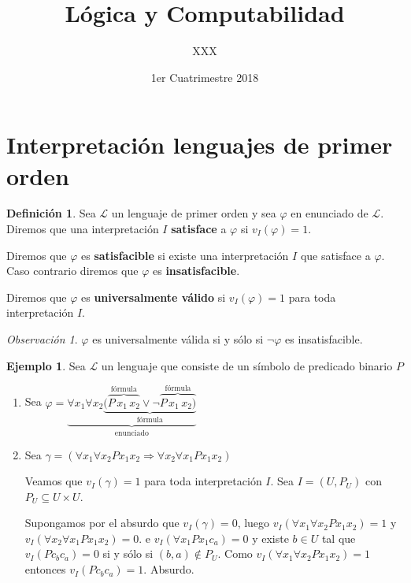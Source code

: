 \documentclass[a4paper,11pt]{article}
\title{Lógica y Computabilidad}
\author{XXX}
\date{1er Cuatrimestre 2018}
\theoremstyle{definition}
\newtheorem{defn}{Definición}[section]
\newtheorem{exap}{Ejemplo}[section]
\theoremstyle{remark}
\newtheorem*{remk}{Observación}
\def\LL{\ensuremath{\mathcal{L}}}
\begin{document}
\maketitle

\section{Interpretación lenguajes de primer orden}

\begin{defn}
    Sea $\LL$ un lenguaje de primer orden y sea $\varphi$ en enunciado de $\LL$. 
    Diremos que una interpretación $I$ \textbf{satisface} a $\varphi$
    si $v_I(\varphi) = 1$.

    Diremos que $\varphi$ es \textbf{satisfacible} si existe una
    interpretación $I$ que satisface a $\varphi$. Caso contrario diremos
    que $\varphi$ es \textbf{insatisfacible}.

    Diremos que $\varphi$ es \textbf{universalmente válido} si
    $v_I(\varphi) = 1$ para toda interpretación $I$.
\end{defn}

\begin{remk}
    $\varphi$ es universalmente válida si y sólo si $\lnot \varphi$
    es insatisfacible.
\end{remk}

\begin{exap}
    Sea $\LL$ un lenguaje que consiste de un símbolo de predicado
    binario $P$

    \begin{enumerate}
        \item Sea $\varphi = \underbrace{\forall x_1 \forall x_2 
        \underbrace{(\overbrace{P\,x_1\,x_2}^{\text{fórmula}} \lor 
        \lnot \overbrace{P\, x_1\,x_2)}^{\text{fórmula}}}_{\text{fórmula}}}_{\text{enunciado}}$

        \item Sea $\gamma = (\forall x_1 \forall x_2 P x_1 x_2
        \Rightarrow \forall x_2 \forall x_1 P x_1 x_2)$

        Veamos que $v_I(\gamma) = 1$ para toda interpretación $I$. 
        Sea $I = (U, P_U)$ con $P_U \subseteq U\times U$.

        Supongamos por el absurdo que $v_I(\gamma) = 0$, luego
        $v_I(\forall x_1 \forall x_2 P x_1 x_2) = 1$ y 
        $v_I(\forall x_2 \forall x_1 P x_1 x_2) = 0$.
        e $v_I(\forall x_1 P x_1 c_a) = 0$
        y existe $b \in U$ tal que $v_I(P c_b c_a) = 0$ si y sólo si
        $(b, a) \not\in P_U$. Como $v_I(\forall x_1 \forall x_2 P x_1 x_2) = 1$
        entonces $v_I(P c_b c_a) = 1$. Absurdo.
    \end{enumerate}
\end{exap}
\end{document}
